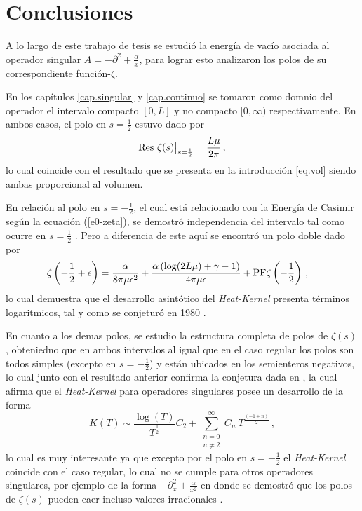 \chapter{Conclusiones}

A lo largo de este trabajo de tesis se estudió la energía de vacío asociada al operador singular $A = - \partial ^2 + \frac{\alpha}{x} $, para lograr esto analizaron los polos de su correspondiente función-$\zeta$.

En los capítulos \ref{cap.singular} y \ref{cap.continuo} se tomaron como domnio del operador el intervalo compacto $[0,L]$ y no compacto $[0, \infty)$ respectivamente.
En ambos casos, el polo en $s = \frac{1}{2}$ estuvo dado por
\begin{equation}
{\rm Res } \ \zeta (s) \big|_{s = \frac{1}{2}}
= \frac{L \mu}{2 \pi}
\, ,
\end{equation}
lo cual coincide con el resultado que se presenta en la introducción \eqref{eq.vol} siendo ambas proporcional al volumen.

En relación al polo en $s= -\frac{1}{2}$, el cual está relacionado con la Energía de Casimir según la ecuación (\ref{e0-zeta}), se demostró independencia del intervalo tal como ocurre en $s= \frac{1}{2}$ . Pero a diferencia de este aquí se encontró un polo doble dado por
\begin{align*}
&
	\zeta \left( - \frac{1}{2} + \epsilon \right) = 
	\frac{\alpha}{8 \pi \mu  \epsilon  ^2} +
	\frac{\alpha \left( \log (2 L \mu ) + \gamma -1  \right)}{4 \pi \mu  \epsilon } +
	{\rm PF } \zeta \left( - \frac{1}{2} \right)
\, ,
\end{align*}
lo cual demuestra que el desarrollo asintótico del {\it Heat-Kernel} presenta términos logaritmicos, tal y como se conjeturó en 1980 \cite{Callias1980}.


En cuanto a los demas polos, se estudio la estructura completa de polos de $\zeta \left(s \right)$, obteniedno que en ambos intervalos al igual que en el caso regular los polos son todos simples (excepto en $s= - \frac{1}{2}$) y están ubicados en los semienteros negativos, lo cual junto con el resultado anterior confirma la conjetura dada en \cite{Callias1980}, la cual afirma que el {\it Heat-Kernel} para operadores singulares posee un desarrollo de la forma  
\begin{equation}
	K(T) \sim 
	\frac{ \log (T)}{T ^{\frac{1}{2} }} C _{2} +
	\sum _{\substack{n=0 \\ n \neq 2}} ^{\infty}
	C _n  \ 
	T^{\frac{(-1+n)}{2}} 
\, ,
\end{equation}
lo cual es muy interesante ya que excepto por el polo en $s = - \frac{1}{2}$ el {\it Heat-Kernel} coincide con el caso regular, lo cual no se cumple para otros operadores singulares, por ejemplo de la forma $- \partial ^2 _x + \frac{\alpha}{x ^2}$ en donde se demostró que los polos de $\zeta (s)$ pueden caer incluso valores irracionales \cite{doi:10.1063/1.1809257}.



